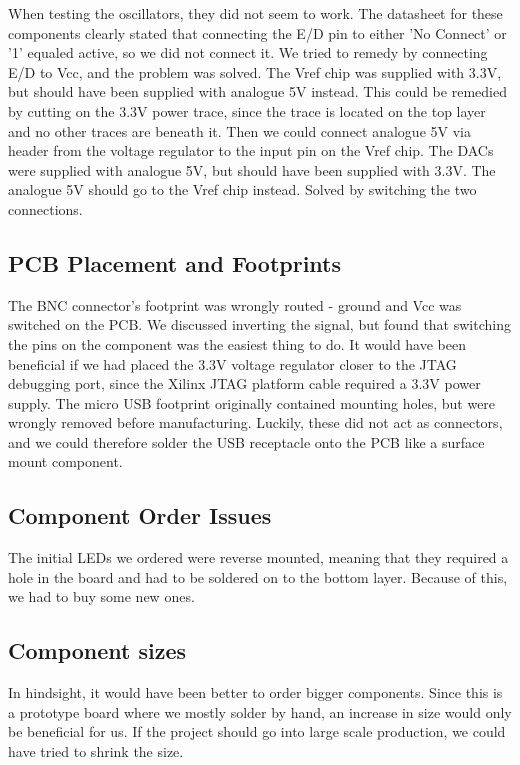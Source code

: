 When testing the oscillators, they did not seem to work. The datasheet for these components clearly stated that connecting the E/D pin to either 'No Connect' or '1' equaled active, so we did not connect it. We tried to remedy by connecting E/D to Vcc, and the problem was solved.
\newline
\newline
The Vref chip was supplied with 3.3V, but should have been supplied with analogue 5V instead. This could be remedied by cutting on the 3.3V power trace, since the trace is located on the top layer and no other traces are beneath it. Then we could connect analogue 5V via header from the voltage regulator to the input pin on the Vref chip.
\newline
The DACs were supplied with analogue 5V, but should have been supplied with 3.3V. The analogue 5V should go to the Vref chip instead. Solved by switching the two connections.

\subsection{PCB Placement and Footprints}
The BNC connector's footprint was wrongly routed - ground and Vcc was switched on the PCB. We discussed inverting the signal, but found that switching the pins on the component was the easiest thing to do.
\newline
\newline
It would have been beneficial if we had placed the 3.3V voltage regulator closer to the JTAG debugging port, since the Xilinx JTAG platform cable required a 3.3V power supply.
\newline
\newline
The micro USB footprint originally contained mounting holes, but were wrongly removed before manufacturing. Luckily, these did not act as connectors, and we could therefore solder the USB receptacle onto the PCB like a surface mount component.

\subsection{Component Order Issues}
The initial LEDs we ordered were reverse mounted, meaning that they required a hole in the board and had to be soldered on to the bottom layer. Because of this, we had to buy some new ones.
\newline
\newline

\subsection{Component sizes}
In hindsight, it would have been better to order bigger components. Since this is a prototype board where we mostly solder by hand, an increase in size would only be beneficial for us. If the project should go into large scale production, we could have tried to shrink the size.


